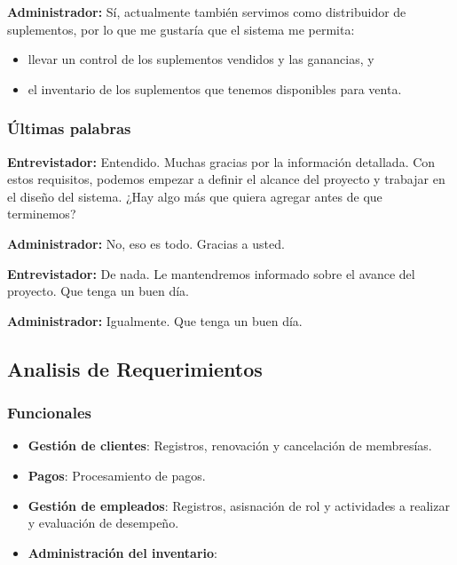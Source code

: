 \documentclass[spanish, 12pt]{article}
\providecommand{\tightlist}{\setlength{\itemsep}{0pt}
\setlength{\parskip}{0pt}}
\begin{document}
	\textbf{Administrador:} Sí, actualmente también servimos como distribuidor de
	suplementos, por lo que me gustaría que el sistema me permita:

	\begin{itemize}
		\tightlist

		\item llevar un control de los suplementos vendidos y las ganancias, y

		\item el inventario de los suplementos que tenemos disponibles para venta.
	\end{itemize}

	\subsubsection{Últimas palabras}
	\label{uxfaltimas-palabras}

	\textbf{Entrevistador:} Entendido. Muchas gracias por la información detallada.
	Con estos requisitos, podemos empezar a definir el alcance del proyecto y trabajar
	en el diseño del sistema. ¿Hay algo más que quiera agregar antes de que
	terminemos?

	\textbf{Administrador:} No, eso es todo. Gracias a usted.

	\textbf{Entrevistador:} De nada. Le mantendremos informado sobre el avance del
	proyecto. Que tenga un buen día.

	\textbf{Administrador:} Igualmente. Que tenga un buen día.

	\subsection{Analisis de Requerimientos}
	\label{analisis-de-requerimientos}

	\subsubsection{Funcionales}
	\label{funcionales}

	\begin{itemize}
		\tightlist

		\item \textbf{Gestión de clientes}: Registros, renovación y cancelación de
			membresías.

		\item \textbf{Pagos}: Procesamiento de pagos.

		\item \textbf{Gestión de empleados}: Registros, asisnación de rol y
			actividades a realizar y evaluación de desempeño.

		\item \textbf{Administración del inventario}:
	\end{itemize}
\end{document}
